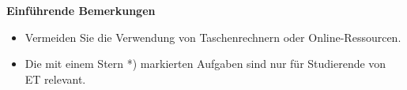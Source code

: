 


\newcommand{\PROFESSOR}{Prof.\ Dr.\ Thomas Carraro}
\newcommand{\ASSISTANT}{\setlength{\tabcolsep}{0pt}\begin{tabular}{l} M.Sc Janna Puderbach\end{tabular}}

\newcommand{\Jahr}{2024}
\newcommand{\Trimester}{FT}
\newcommand{\Kurs}{Mathematik III/B (WI/ET)}
\newcommand{\TYPE}{Aufgabenblatt}
\newcommand{\BLATT}{20}
\newcommand{\TOPIC}{Delta-Distribution, Dgl-Systeme, Extrempunkte }

\usepackage{tikz}
\usetikzlibrary{decorations.pathmorphing} %
\usepackage{pgf}
\usepackage{circuitikz}
% 






% 
\renewcommand{\d }{\mathrm{d}}

\textbf{Einführende Bemerkungen}

\begin{itemize}
\item Vermeiden Sie die Verwendung von Taschenrechnern oder Online-Ressourcen.
\item Die mit einem Stern *) markierten Aufgaben sind nur für Studierende von ET relevant.

\end{itemize}



